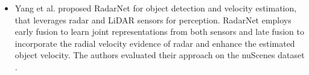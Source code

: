 \documentclass[rnd]{mas_proposal}
\begin{document}
\begin{itemize}
      
      \item Yang et al. \cite{yang2020radarnet} proposed RadarNet for object detection and velocity estimation, that leverages radar and LiDAR sensors for perception. RadarNet employs early fusion to learn joint representations from both sensors and late fusion to incorporate the radial velocity evidence of radar and enhance the estimated object velocity. The authors evaluated their approach on the nuScenes dataset \cite{caesar2020nuscenes}.


\end{itemize}
\end{document}
